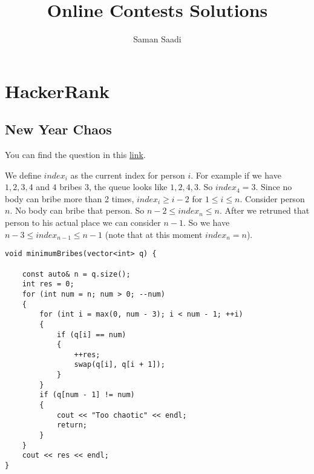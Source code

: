 \documentclass{book}
\title{Online Contests Solutions}
\author{Saman Saadi}
\date{}
\begin{document}
	\frontmatter
	\maketitle
	\tableofcontents
	\mainmatter
	\chapter{HackerRank}
	\section{New Year Chaos}
	 You can find the question in this \href{https://www.hackerrank.com/challenges/new-year-chaos/problem?h_l=interview&playlist_slugs%5B%5D=interview-preparation-kit&playlist_slugs%5B%5D=arrays}{link}.
	 \par We define $index_i$ as the current index for person $i$. For example if we have $1, 2, 3, 4$ and $4$ bribes $3$, the queue looks like $1, 2, 4, 3$. So $index_4 = 3$. Since no body can bribe more than 2 times, $index_i \ge i - 2$ for $1 \le i \le n$. Consider person $n$. No body can bribe that person. So $n - 2 \le index_n \le n$. After we retruned that person to his actual place we can consider $n - 1$. So we have $n - 3 \le index_{n - 1} \le n - 1$ (note that at this moment $index_n = n$).
	 \begin{lstlisting}
void minimumBribes(vector<int> q) {

    const auto& n = q.size();
    int res = 0;
    for (int num = n; num > 0; --num)
    {
        for (int i = max(0, num - 3); i < num - 1; ++i)
        {
            if (q[i] == num)
            {
                ++res;
                swap(q[i], q[i + 1]);
            }
        }
        if (q[num - 1] != num)
        {
            cout << "Too chaotic" << endl;
            return;
        }
    }
    cout << res << endl;
}
	 \end{lstlisting}
	 
\end{document}
